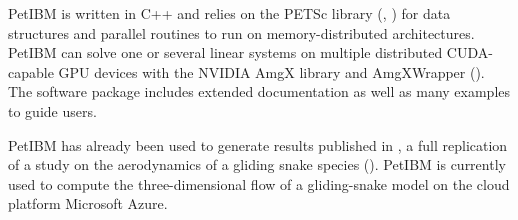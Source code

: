 PetIBM is written in C++ and relies on the PETSc library (\cite{petsc_1997}, \cite{petsc_user_ref_2017}) for data structures and parallel routines to run on memory-distributed architectures.
PetIBM can solve one or several linear systems on multiple distributed CUDA-capable GPU devices with the NVIDIA AmgX library and AmgXWrapper (\cite{chuang_barba_2017}).
The software package includes extended documentation as well as many examples to guide users.

PetIBM has already been used to generate results published in \cite{mesnard_barba_2017}, a full replication of a study on the aerodynamics of a gliding snake species (\cite{krishnan_et_al_2014}).
PetIBM is currently used to compute the three-dimensional flow of a gliding-snake model on the cloud platform Microsoft Azure.
